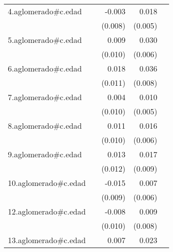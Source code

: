 {\begin{longtable}{l*{4}{D{.}{.}{-1}}}
\addlinespace
4.aglomerado#c.edad&                     &      -0.003         &       0.018\sym{***}&                     \\
            &                     &     (0.008)         &     (0.005)         &                     \\
\addlinespace
5.aglomerado#c.edad&                     &       0.009         &       0.030\sym{***}&                     \\
            &                     &     (0.010)         &     (0.006)         &                     \\
\addlinespace
6.aglomerado#c.edad&                     &       0.018         &       0.036\sym{***}&                     \\
            &                     &     (0.011)         &     (0.008)         &                     \\
\addlinespace
7.aglomerado#c.edad&                     &       0.004         &       0.010\sym{*}  &                     \\
            &                     &     (0.010)         &     (0.005)         &                     \\
\addlinespace
8.aglomerado#c.edad&                     &       0.011         &       0.016\sym{**} &                     \\
            &                     &     (0.010)         &     (0.006)         &                     \\
\addlinespace
9.aglomerado#c.edad&                     &       0.013         &       0.017         &                     \\
            &                     &     (0.012)         &     (0.009)         &                     \\
\addlinespace
10.aglomerado#c.edad&                     &      -0.015         &       0.007         &                     \\
            &                     &     (0.009)         &     (0.006)         &                     \\
\addlinespace
12.aglomerado#c.edad&                     &      -0.008         &       0.009         &                     \\
            &                     &     (0.010)         &     (0.008)         &                     \\
\addlinespace
13.aglomerado#c.edad&                     &       0.007         &       0.023\sym{***}&                     \\

\end{longtable}}
